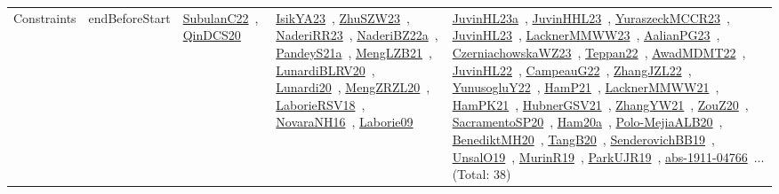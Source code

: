 {\begin{longtable}{lp{3cm}>{\raggedright\arraybackslash}p{6cm}>{\raggedright\arraybackslash}p{6cm}>{\raggedright\arraybackslash}p{8cm}}
Constraints & endBeforeStart & \href{../works/SubulanC22.pdf}{SubulanC22}~\cite{SubulanC22}, \href{../works/QinDCS20.pdf}{QinDCS20}~\cite{QinDCS20} & \href{../works/IsikYA23.pdf}{IsikYA23}~\cite{IsikYA23}, \href{../works/ZhuSZW23.pdf}{ZhuSZW23}~\cite{ZhuSZW23}, \href{../works/NaderiRR23.pdf}{NaderiRR23}~\cite{NaderiRR23}, \href{../works/NaderiBZ22a.pdf}{NaderiBZ22a}~\cite{NaderiBZ22a}, \href{../works/PandeyS21a.pdf}{PandeyS21a}~\cite{PandeyS21a}, \href{../works/MengLZB21.pdf}{MengLZB21}~\cite{MengLZB21}, \href{../works/LunardiBLRV20.pdf}{LunardiBLRV20}~\cite{LunardiBLRV20}, \href{../works/Lunardi20.pdf}{Lunardi20}~\cite{Lunardi20}, \href{../works/MengZRZL20.pdf}{MengZRZL20}~\cite{MengZRZL20}, \href{../works/LaborieRSV18.pdf}{LaborieRSV18}~\cite{LaborieRSV18}, \href{../works/NovaraNH16.pdf}{NovaraNH16}~\cite{NovaraNH16}, \href{../works/Laborie09.pdf}{Laborie09}~\cite{Laborie09} & \href{../works/JuvinHL23a.pdf}{JuvinHL23a}~\cite{JuvinHL23a}, \href{../works/JuvinHHL23.pdf}{JuvinHHL23}~\cite{JuvinHHL23}, \href{../works/YuraszeckMCCR23.pdf}{YuraszeckMCCR23}~\cite{YuraszeckMCCR23}, \href{../works/JuvinHL23.pdf}{JuvinHL23}~\cite{JuvinHL23}, \href{../works/LacknerMMWW23.pdf}{LacknerMMWW23}~\cite{LacknerMMWW23}, \href{../works/AalianPG23.pdf}{AalianPG23}~\cite{AalianPG23}, \href{../works/CzerniachowskaWZ23.pdf}{CzerniachowskaWZ23}~\cite{CzerniachowskaWZ23}, \href{../works/Teppan22.pdf}{Teppan22}~\cite{Teppan22}, \href{../works/AwadMDMT22.pdf}{AwadMDMT22}~\cite{AwadMDMT22}, \href{../works/JuvinHL22.pdf}{JuvinHL22}~\cite{JuvinHL22}, \href{../works/CampeauG22.pdf}{CampeauG22}~\cite{CampeauG22}, \href{../works/ZhangJZL22.pdf}{ZhangJZL22}~\cite{ZhangJZL22}, \href{../works/YunusogluY22.pdf}{YunusogluY22}~\cite{YunusogluY22}, \href{../works/HamP21.pdf}{HamP21}~\cite{HamP21}, \href{../works/LacknerMMWW21.pdf}{LacknerMMWW21}~\cite{LacknerMMWW21}, \href{../works/HamPK21.pdf}{HamPK21}~\cite{HamPK21}, \href{../works/HubnerGSV21.pdf}{HubnerGSV21}~\cite{HubnerGSV21}, \href{../works/ZhangYW21.pdf}{ZhangYW21}~\cite{ZhangYW21}, \href{../works/ZouZ20.pdf}{ZouZ20}~\cite{ZouZ20}, \href{../works/SacramentoSP20.pdf}{SacramentoSP20}~\cite{SacramentoSP20}, \href{../works/Ham20a.pdf}{Ham20a}~\cite{Ham20a}, \href{../works/Polo-MejiaALB20.pdf}{Polo-MejiaALB20}~\cite{Polo-MejiaALB20}, \href{../works/BenediktMH20.pdf}{BenediktMH20}~\cite{BenediktMH20}, \href{../works/TangB20.pdf}{TangB20}~\cite{TangB20}, \href{../works/SenderovichBB19.pdf}{SenderovichBB19}~\cite{SenderovichBB19}, \href{../works/UnsalO19.pdf}{UnsalO19}~\cite{UnsalO19}, \href{../works/MurinR19.pdf}{MurinR19}~\cite{MurinR19}, \href{../works/ParkUJR19.pdf}{ParkUJR19}~\cite{ParkUJR19}, \href{../works/abs-1911-04766.pdf}{abs-1911-04766}~\cite{abs-1911-04766}... (Total: 38)\\

\end{longtable}}
